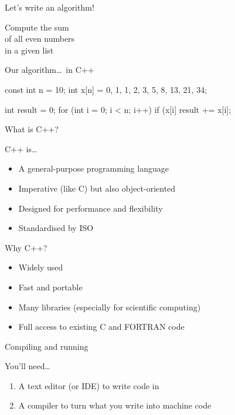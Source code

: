 \begin{frame}{Let's write an algorithm!}
    \begin{center}
        \Large%
        Compute the sum \\
        of all even numbers \\
        in a given list
    \end{center}
\end{frame}

\begin{frame}[fragile]{Our algorithm\ldots~in C++}
    \begin{cpp}
        const int n = 10;
        int x[n] = {0, 1, 1, 2, 3, 5, 8, 13, 21, 34};

        int result = 0;
        for (int i = 0; i < n; i++)
        {
            if (x[i] %
            {
                result += x[i];
            }
        }
    \end{cpp}
\end{frame}

\begin{frame}{What is C++?}
    \begin{block}{C++ is\ldots}
        \begin{itemize}
            \item A general\hyp{}purpose programming language
            \item Imperative (like C) but also object\hyp{}oriented
            \item Designed for performance and flexibility
            \item Standardised by ISO
        \end{itemize}
    \end{block}
\end{frame}

\begin{frame}{Why C++?}
    \begin{itemize}
        \item Widely used
        \item Fast and portable
        \item Many libraries (especially for scientific computing)
        \item Full access to existing C and FORTRAN code
    \end{itemize}
\end{frame}

\begin{frame}{Compiling and running}
    \begin{block}{You'll need\ldots}
        \begin{enumerate}
            \item A \alert{text editor} (or \alert{IDE}) to write code in
            \item A \alert{compiler} to turn what you write into machine code
        \end{enumerate}
    \end{block}
\end{frame}


